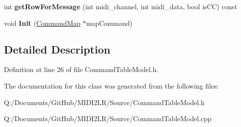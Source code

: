\begin{DoxyCompactItemize}
\item 
int {\bfseries get\+Row\+For\+Message} (int midi\+\_\+channel, int midi\+\_\+data, bool is\+CC) const \hypertarget{class_command_table_model_a718bd444e2e6a23b7ca4375ac3a94b39}{}\label{class_command_table_model_a718bd444e2e6a23b7ca4375ac3a94b39}

\item 
void {\bfseries Init} (\hyperlink{class_command_map}{Command\+Map} $\ast$map\+Command)\hypertarget{class_command_table_model_a8d9162b964812e0bb75d853abc980db8}{}\label{class_command_table_model_a8d9162b964812e0bb75d853abc980db8}

\end{DoxyCompactItemize}


\subsection{Detailed Description}


Definition at line 26 of file Command\+Table\+Model.\+h.



The documentation for this class was generated from the following files\+:\begin{DoxyCompactItemize}
\item 
Q\+:/\+Documents/\+Git\+Hub/\+M\+I\+D\+I2\+L\+R/\+Source/Command\+Table\+Model.\+h\item 
Q\+:/\+Documents/\+Git\+Hub/\+M\+I\+D\+I2\+L\+R/\+Source/Command\+Table\+Model.\+cpp\end{DoxyCompactItemize}
